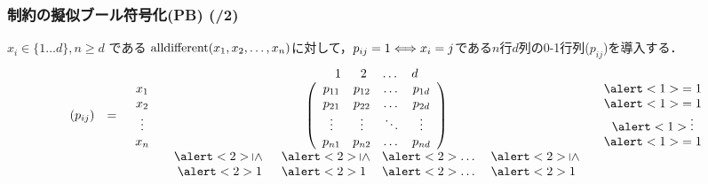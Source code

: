 \begin{frame}
    \frametitle{{\alldiff}制約の擬似ブール符号化(PB) (/2)}
    \begin{exampleblock}{}
        $x_i \in \{ 1 \dots d \}, n \geq d$ である $\textrm{alldifferent}(x_1,x_2,\ldots,x_n)$に対して，$p_{ij}=1 \Longleftrightarrow x_i=j$である$n$行$d$列の0-1行列($p_{ij}$)を導入する．
        \begin{displaymath}
            \begin{array}{ccccc}
             & & & \begin{array}{cccc}  1\;\;&2&\;\dots&d \end{array}&\\
                (p_{ij})&=&
                \begin{array}{c}x_1\\ x_2\\ \vdots\\ x_n \end{array}&
                \left(
                    \begin{array}{cccc}
                        p_{11}&p_{12}&\dots&p_{1d}\\
                        p_{21}&p_{22}&\dots&p_{2d}\\
                        \vdots&\vdots&\ddots&\vdots\\
                        p_{n1}&p_{n2}&\dots&p_{nd}
                \end{array}\right)&
                \begin{array}{c} \alert<1>{= 1}\\ \alert<1>{= 1}\\ \alert<1>{\vdots}\\ \alert<1>{= 1} \end{array}\\
                & & & \begin{array}{cccc}  
                \alert<2>{\rotatebox[origin=c]{-90}{$\leq$}}\;\;&
                \alert<2>{\rotatebox[origin=c]{-90}{$\leq$}}&
                \alert<2>{\dots}\;&
                \alert<2>{\rotatebox[origin=c]{-90}{$\leq$}} 
                \end{array}&\\
                & & & \begin{array}{cccc}  \alert<2>{1}\;\;&\alert<2>{1}&\;\alert<2>{\dots}\;&\alert<2>{1} \end{array}&

\end{array}
\end{displaymath}
\end{exampleblock}
\end{frame}

